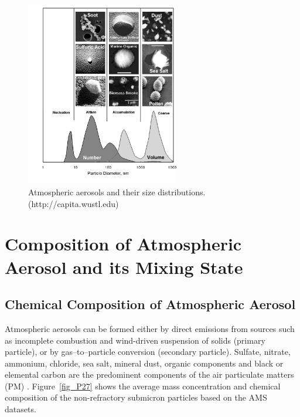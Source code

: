 \documentclass[12pt, fullpage]{uiucthesis2009_2}
\begin{document}
		\begin{figure}[h] 
			\begin{center}
				\includegraphics[width = 0.6\textwidth]{Figure26}
				\caption[Atmospheric aerosols and their size distributions]{\label{fig_P26} Atmospheric aerosols and their size distributions. \\ (http://capita.wustl.edu)}
			\end{center}
		\end{figure}

	\section{Composition of Atmospheric Aerosol and its Mixing State}
	\subsection{Chemical Composition of Atmospheric Aerosol}
	Atmospheric aerosols can be formed either by direct emissions from sources such as incomplete combustion and wind-driven suspension of solids (primary particle), or by gas--to--particle conversion (secondary particle). Sulfate, nitrate, ammonium, chloride, sea salt, mineral dust, organic components and black or elemental carbon are the predominent components of the air particulate matters (PM) \citep{poschl2005}. Figure~\ref{fig_P27} shows the average mass concentration and chemical composition of the non-refractory submicron particles based on the AMS datasets.
	
\end{document}
